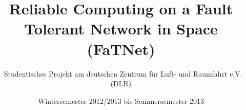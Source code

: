 \documentclass{scrartcl}
\begin{document}
\begin{titlepage}
\thispagestyle{empty}
\titlehead{\centering Designdokument}
\title{Reliable Computing on a \textbf{Fa}ult \textbf{T}olerant \textbf{Net}work in Space (FaTNet)\bigskip}
\subtitle{\bigskip $\;$ \bigskip Studentisches Projekt am deutschen Zentrum für Luft- und Raumfahrt e.V. (DLR)}
\bigskip

\author{Wintersemester 2012/2013 bis Sommersemester 2013\bigskip}
\date{\bigskip}
\publishers{Bearbeitet von:\\Andre Pols, Christian Uphaus, David Weigel, Esther Funken, Gerfried Oltmanns, Jonas Rahlf, Simon Schaller, Stefan Rasch, Tobias Sachtje\\ \bigskip \vspace*{10mm} \today \\ \bigskip \vspace*{10mm} Version: 2.1}
\begingroup
 \makeatletter
 \@titlepagetrue
 \maketitle
\endgroup
\end{titlepage}


\newpage
\tableofcontents
\clearpage
{}









\end{document}
